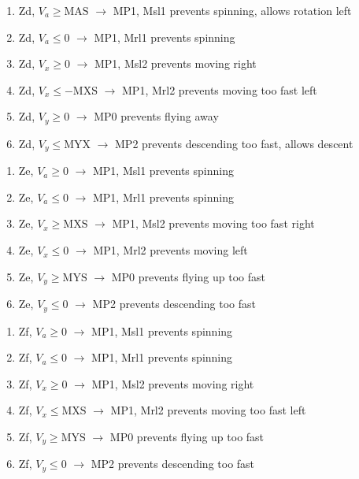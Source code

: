 \documentclass{article}
\begin{document}
    \begin{enumerate}
    \item Zd, $V_a \geq \text{MAS}$ $\rightarrow$ MP1, Msl1 \hfill prevents spinning, allows rotation left
    \item Zd, $V_a \leq 0$ $\rightarrow$ MP1, Mrl1 \hfill prevents spinning
    \item Zd, $V_x \geq 0$ $\rightarrow$ MP1, Msl2 \hfill prevents moving right
    \item Zd, $V_x \leq -\text{MXS}$ $\rightarrow$ MP1, Mrl2 \hfill prevents moving too fast left
    \item Zd, $V_y \geq 0$ $\rightarrow$ MP0 \hfill prevents flying away
    \item Zd, $V_y \leq \text{MYX}$ $\rightarrow$ MP2 \hfill prevents descending too fast, allows descent
\end{enumerate}
    
\begin{enumerate}
    \item Ze, $V_a \geq 0$ $\rightarrow$ MP1, Msl1 \hfill prevents spinning
    \item Ze, $V_a \leq 0$ $\rightarrow$ MP1, Mrl1 \hfill prevents spinning
    \item Ze, $V_x \geq \text{MXS}$ $\rightarrow$ MP1, Msl2 \hfill prevents moving too fast right
    \item Ze, $V_x \leq 0$ $\rightarrow$ MP1, Mrl2 \hfill prevents moving left
    \item Ze, $V_y \geq \text{MYS}$ $\rightarrow$ MP0 \hfill prevents flying up too fast
    \item Ze, $V_y \leq 0$ $\rightarrow$ MP2 \hfill prevents descending too fast
    \end{enumerate}
    
\begin{enumerate}
    \item Zf, $V_a \geq 0$ $\rightarrow$ MP1, Msl1 \hfill prevents spinning
    \item Zf, $V_a \leq 0$ $\rightarrow$ MP1, Mrl1 \hfill prevents spinning
    \item Zf, $V_x \geq 0$ $\rightarrow$ MP1, Msl2 \hfill prevents moving right
    \item Zf, $V_x \leq \text{MXS}$ $\rightarrow$ MP1, Mrl2 \hfill prevents moving too fast left
    \item Zf, $V_y \geq \text{MYS}$ $\rightarrow$ MP0 \hfill prevents flying up too fast
    \item Zf, $V_y \leq 0$ $\rightarrow$ MP2 \hfill prevents descending too fast
\end{enumerate}
    
\end{document}
